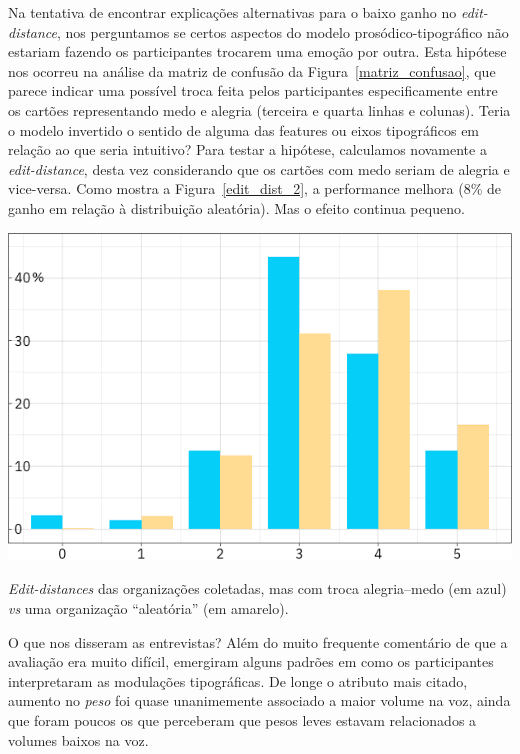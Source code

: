 \documentclass[a4paper]{tufte-handout}
\begin{document}
Na tentativa de encontrar explicações alternativas para o baixo ganho no \textit{edit-distance}, nos perguntamos se certos aspectos do modelo prosódico-tipográfico não estariam fazendo os participantes trocarem uma emoção por outra. Esta hipótese nos ocorreu na análise da matriz de confusão da Figura~\ref{matriz_confusao}, que parece indicar uma possível troca feita pelos participantes especificamente entre os cartões representando medo e alegria (terceira e quarta linhas e colunas). Teria o modelo invertido o sentido de alguma das features ou eixos tipográficos em relação ao que seria intuitivo? Para testar a hipótese, calculamos novamente a \textit{edit-distance}, desta vez considerando que os cartões com medo seriam de alegria e vice-versa. Como mostra a Figura~\ref{edit_dist_2}, a performance melhora (8\% de ganho em relação à distribuição aleatória). Mas o efeito continua pequeno.

\begin{marginfigure}[-3\baselineskip]
  \includegraphics{imgs/edit_distance_troca.png}
  \caption{\textit{Edit-distances} das organizações coletadas, mas com troca alegria--medo (em azul) \textit{vs} uma organização ``aleatória'' (em amarelo).}
  \label{edit_dist_2}
\end{marginfigure}

O que nos disseram as entrevistas? Além do muito frequente comentário de que a avaliação era muito difícil, emergiram alguns padrões em como os participantes interpretaram as modulações tipográficas. De longe o atributo mais citado, aumento no \textit{peso} foi quase unanimemente associado a maior volume na voz, ainda que foram poucos os que perceberam que pesos leves estavam relacionados a volumes baixos na voz.
\end{document}
